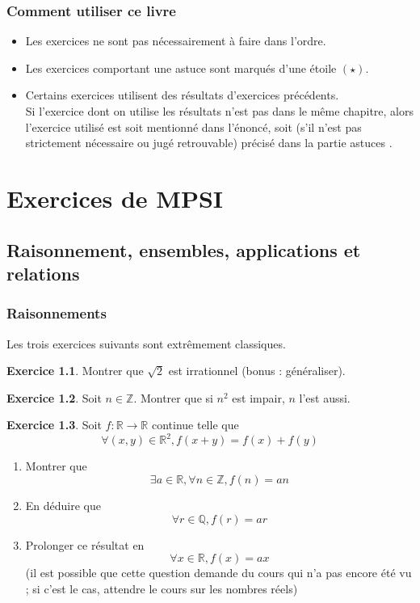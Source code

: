 \documentclass[12pt,a4paper]{book}
\theoremstyle{definition}
\newtheorem{exo}{Exercice}[section]
\theoremstyle{remark}
\newcommand{\Z}{\mathbb{Z}}
\newcommand{\Q}{\mathbb{Q}}
\newcommand{\R}{\mathbb{R}}
\newcommand{\astuce}{$(\star)$}
\begin{document}
\section*{Comment utiliser ce livre}

\begin{itemize}
    \item Les exercices ne sont pas nécessairement à faire dans l'ordre.
    \item Les exercices comportant une astuce sont marqués d'une étoile \astuce.
    \item Certains exercices utilisent des résultats d'exercices précédents.\\
    Si l'exercice dont on utilise les résultats n'est pas dans le même chapitre, alors l'exercice utilisé est soit mentionné dans l'énoncé, soit (s'il n'est pas strictement nécessaire ou jugé retrouvable) précisé dans la partie \og astuces \fg.
\end{itemize}

\tableofcontents

\part{Exercices de MPSI}

\chapter{Raisonnement, ensembles, applications et relations}

\section{Raisonnements}

Les trois exercices suivants sont extrêmement classiques.

\begin{exo}
    Montrer que $\sqrt{2}$ est irrationnel (bonus : généraliser).
\end{exo}

\begin{exo}
    Soit $n \in \Z$. Montrer que si $n^2$ est impair, $n$ l'est aussi.
\end{exo}

\begin{exo}
    Soit $f : \R \to \R$ continue telle que
    \[\forall (x,y)\in \R ^2, f(x + y) = f(x) + f(y)\]
    \begin{enumerate}
        \item Montrer que
        \[\exists a \in \R, \forall n \in \Z, f(n) = an \]
        \item En déduire que
        \[\forall r \in \Q, f(r) = ar\]
        \item Prolonger ce résultat en
        \[\forall x \in \R, f(x) = ax\]
        (il est possible que cette question demande du cours qui n'a pas encore été vu ; si c'est le cas, attendre le cours sur les nombres réels)
    \end{enumerate}
\end{exo}
\end{document}
